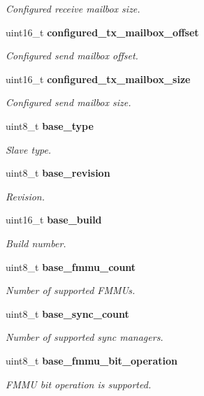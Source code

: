 \begin{DoxyCompactItemize}
\begin{DoxyCompactList}\small\item\em Configured receive mailbox size. \end{DoxyCompactList}\item 
uint16\-\_\-t {\bf configured\-\_\-tx\-\_\-mailbox\-\_\-offset}
\begin{DoxyCompactList}\small\item\em Configured send mailbox offset. \end{DoxyCompactList}\item 
uint16\-\_\-t {\bf configured\-\_\-tx\-\_\-mailbox\-\_\-size}
\begin{DoxyCompactList}\small\item\em Configured send mailbox size. \end{DoxyCompactList}\item 
uint8\-\_\-t {\bf base\-\_\-type}
\begin{DoxyCompactList}\small\item\em Slave type. \end{DoxyCompactList}\item 
uint8\-\_\-t {\bf base\-\_\-revision}
\begin{DoxyCompactList}\small\item\em Revision. \end{DoxyCompactList}\item 
uint16\-\_\-t {\bf base\-\_\-build}
\begin{DoxyCompactList}\small\item\em Build number. \end{DoxyCompactList}\item 
uint8\-\_\-t {\bf base\-\_\-fmmu\-\_\-count}
\begin{DoxyCompactList}\small\item\em Number of supported F\-M\-M\-Us. \end{DoxyCompactList}\item 
uint8\-\_\-t {\bf base\-\_\-sync\-\_\-count}
\begin{DoxyCompactList}\small\item\em Number of supported sync managers. \end{DoxyCompactList}\item 
uint8\-\_\-t {\bf base\-\_\-fmmu\-\_\-bit\-\_\-operation}
\begin{DoxyCompactList}\small\item\em F\-M\-M\-U bit operation is supported. \end{DoxyCompactList}\item 

\end{DoxyCompactItemize}
